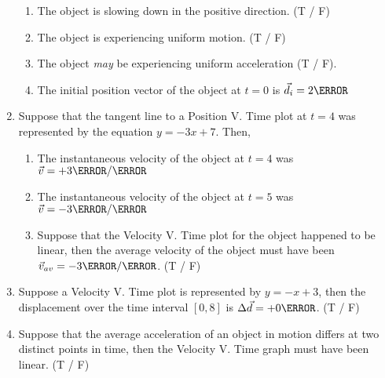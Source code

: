 \documentclass[12pt]{article} %
\begin{document}
\begin{qstn}[1]
\begin{enumerate}
            \begin{enumerate}[label = (\alph*)]
                \item The object is slowing down in the positive direction. (T / F)
                \item The object is experiencing uniform motion. (T / F)
                \item The object \emph{may} be experiencing uniform acceleration (T / F).
                \item The initial position vector of the object at $t = 0$ is $\vec d_i = 2 \m$
            \end{enumerate}
        \item Suppose that the tangent line to a Position V. Time plot at $t = 4$ was represented by the equation $y = -3x + 7$. Then,
            \begin{enumerate}[label = (\alph*)]
                \item The instantaneous velocity of the object at $t = 4$ was $\vec v = +3 \m / \s$
                \item The instantaneous velocity of the object at $t = 5$ was $\vec v = -3 \m / \s$
                \item Suppose that the Velocity V. Time plot for the object happened to be linear, then the average velocity of the object must have been $\vec v_{av} = -3\m / \s$. (T / F)
            \end{enumerate}
        \item Suppose a Velocity V. Time plot is represented by $y = -x + 3$, then the displacement over the time interval $[0,8]$ is $\Delta \vec d = +0 \m$. (T / F)
        \item Suppose that the average acceleration of an object in motion differs at two distinct points in time, then the Velocity V. Time graph must have been linear. (T / F)

    \end{enumerate}

 \end{qstn}
\end{document}
